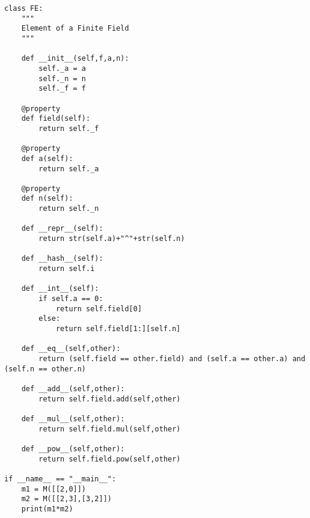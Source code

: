 \documentclass[12pt]{amsart}
\theoremstyle{plain}
\begin{document}
\begin{verbatim}
class FE:
    """
    Element of a Finite Field
    """

    def __init__(self,f,a,n):
        self._a = a
        self._n = n
        self._f = f

    @property
    def field(self):
        return self._f

    @property
    def a(self):
        return self._a

    @property
    def n(self):
        return self._n

    def __repr__(self):
        return str(self.a)+"^"+str(self.n)

    def __hash__(self):
        return self.i

    def __int__(self):
        if self.a == 0:
            return self.field[0]
        else:
            return self.field[1:][self.n]

    def __eq__(self,other):
        return (self.field == other.field) and (self.a == other.a) and (self.n == other.n)

    def __add__(self,other):
        return self.field.add(self,other)

    def __mul__(self,other):
        return self.field.mul(self,other)

    def __pow__(self,other):
        return self.field.pow(self,other)

if __name__ == "__main__":
    m1 = M([[2,0]])
    m2 = M([[2,3],[3,2]])
    print(m1*m2)

\end{verbatim}
\end{document}
